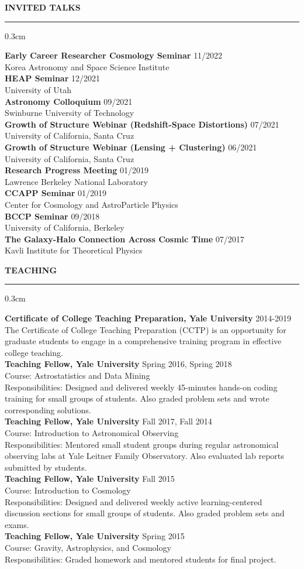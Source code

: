 \documentclass[12pt]{article}
\renewenvironment{section}[1]
  {
  \medskip
  {\color{yaleblue} \MakeUppercase{\bf #1}}
  \smallskip
  \hrule
  \medskip
  \begin{adjustwidth}{0.3cm}{}
  }
  {
  \end{adjustwidth}
  }
\newcommand{\entry}[3]{{\bf #1} \hfill {#2} \\ {#3}}
\begin{document}
\begin{section}{Invited Talks}
  \entry{Early Career Researcher Cosmology Seminar}{11/2022}{Korea Astronomy and Space Science Institute} \medskip \\
  \entry{HEAP Seminar}{12/2021}{University of Utah} \medskip \\
  \entry{Astronomy Colloquium}{09/2021}{Swinburne University of Technology} \medskip \\
  \entry{Growth of Structure Webinar (Redshift-Space Distortions)}{07/2021}{University of California, Santa Cruz} \medskip \\
  \entry{Growth of Structure Webinar (Lensing + Clustering)}{06/2021}{University of California, Santa Cruz} \medskip \\
  \entry{Research Progress Meeting}{01/2019}{Lawrence Berkeley National Laboratory} \medskip \\
  \entry{CCAPP Seminar}{01/2019}{Center for Cosmology and AstroParticle Physics} \medskip \\
  \entry{BCCP Seminar}{09/2018}{University of California, Berkeley} \medskip \\
  \entry{The Galaxy-Halo Connection Across Cosmic Time}{07/2017}{Kavli Institute for Theoretical Physics}
\end{section}

\begin{section}{Teaching}
  \entry{Certificate of College Teaching Preparation, Yale University}{2014-2019}{The Certificate of College Teaching Preparation (CCTP) is an opportunity for graduate students to engage in a comprehensive training program in effective college teaching.} \medskip \\
  \entry{Teaching Fellow, Yale University}{Spring 2016, Spring 2018}{Course: Astrostatistics and Data Mining\\ Responsibilities: Designed and delivered weekly 45-minutes hands-on coding training for small groups of students. Also graded problem sets and wrote corresponding solutions.} \medskip \\
  \entry{Teaching Fellow, Yale University}{Fall 2017, Fall 2014}{Course: Introduction to Astronomical Observing\\ Responsibilities: Mentored small student groups during regular astronomical observing labs at Yale Leitner Family Observatory. Also evaluated lab reports submitted by students.} \medskip \\
  \entry{Teaching Fellow, Yale University}{Fall 2015}{Course: Introduction to Cosmology\\ Responsibilities: Designed and delivered weekly active learning-centered discussion sections for small groups of students. Also graded problem sets and exams.} \medskip \\
  \entry{Teaching Fellow, Yale University}{Spring 2015}{Course: Gravity, Astrophysics, and Cosmology\\ Responsibilities: Graded homework and mentored students for final project.}
\end{section}
\end{document}
